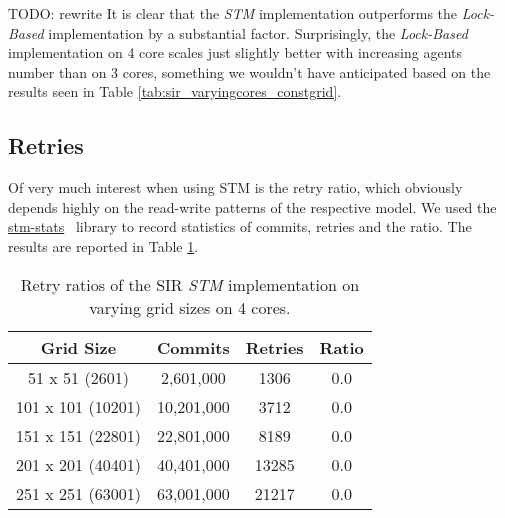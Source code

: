 TODO: rewrite
It is clear that the \textit{STM} implementation outperforms the \textit{Lock-Based} implementation by a substantial factor. Surprisingly, the \textit{Lock-Based} implementation on 4 core scales just slightly better with increasing agents number than on 3 cores, something we wouldn't have anticipated based on the results seen in Table \ref{tab:sir_varyingcores_constgrid}. %

\subsection{Retries}
Of very much interest when using STM is the retry ratio, which obviously depends highly on the read-write patterns of the respective model. We used the \href{http://hackage.haskell.org/package/stm-stats}{stm-stats}~\cite{stm_stats_library} library to record statistics of commits, retries and the ratio. The results are reported in Table \ref{tab:retries_stm}.

\begin{table}
	\centering
  	\begin{tabular}{ c || c | c | c }
        Grid Size 		   & Commits     & Retries  & Ratio  \\ \hline \hline 
   		51 x 51 (2601)     & 2,601,000   & 1306     & 0.0    \\ \hline
   		101 x 101 (10201)  & 10,201,000  & 3712     & 0.0    \\ \hline
   		151 x 151 (22801)  & 22,801,000  & 8189     & 0.0    \\ \hline
   		201 x 201 (40401)  & 40,401,000  & 13285    & 0.0    \\ \hline
   		251 x 251 (63001)  & 63,001,000  & 21217    & 0.0    \\ \hline \hline
  	\end{tabular}
  	
  	\caption{Retry ratios of the SIR \textit{STM} implementation on varying grid sizes on 4 cores.}
	\label{tab:retries_stm}
\end{table}

